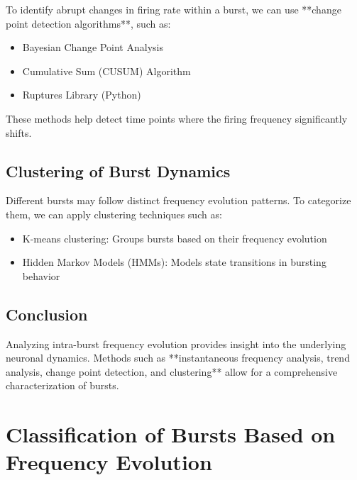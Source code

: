 \documentclass[a4paper,9pt]{extarticle}
\begin{document}
To identify abrupt changes in firing rate within a burst, we can use **change point detection algorithms**, such as:

\begin{itemize}
    \item Bayesian Change Point Analysis
    \item Cumulative Sum (CUSUM) Algorithm
    \item Ruptures Library (Python)
\end{itemize}

These methods help detect time points where the firing frequency significantly shifts.

\subsection{Clustering of Burst Dynamics}

Different bursts may follow distinct frequency evolution patterns. To categorize them, we can apply clustering techniques such as:

\begin{itemize}
    \item K-means clustering: Groups bursts based on their frequency evolution
    \item Hidden Markov Models (HMMs): Models state transitions in bursting behavior
\end{itemize}

\subsection{Conclusion}

Analyzing intra-burst frequency evolution provides insight into the underlying neuronal dynamics. Methods such as **instantaneous frequency analysis, trend analysis, change point detection, and clustering** allow for a comprehensive characterization of bursts.


\section{Classification of Bursts Based on Frequency Evolution}
\end{document}
